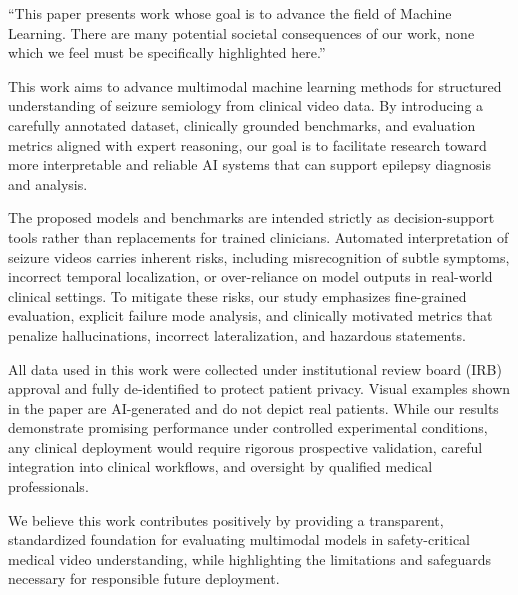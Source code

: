\documentclass{article}
\theoremstyle{plain}
\theoremstyle{definition}
\theoremstyle{remark}
\begin{document}
``This paper presents work whose goal is to advance the field of Machine
Learning. There are many potential societal consequences of our work, none
which we feel must be specifically highlighted here.''\fi


This work aims to advance multimodal machine learning methods for structured understanding of seizure semiology from clinical video data. By introducing a carefully annotated dataset, clinically grounded benchmarks, and evaluation metrics aligned with expert reasoning, our goal is to facilitate research toward more interpretable and reliable AI systems that can support epilepsy diagnosis and analysis.

The proposed models and benchmarks are intended strictly as decision-support tools rather than replacements for trained clinicians. Automated interpretation of seizure videos carries inherent risks, including misrecognition of subtle symptoms, incorrect temporal localization, or over-reliance on model outputs in real-world clinical settings. To mitigate these risks, our study emphasizes fine-grained evaluation, explicit failure mode analysis, and clinically motivated metrics that penalize hallucinations, incorrect lateralization, and hazardous statements.

All data used in this work were collected under institutional review board (IRB) approval and fully de-identified to protect patient privacy. Visual examples shown in the paper are AI-generated and do not depict real patients. While our results demonstrate promising performance under controlled experimental conditions, any clinical deployment would require rigorous prospective validation, careful integration into clinical workflows, and oversight by qualified medical professionals.

We believe this work contributes positively by providing a transparent, standardized foundation for evaluating multimodal models in safety-critical medical video understanding, while highlighting the limitations and safeguards necessary for responsible future deployment.

\end{document}

